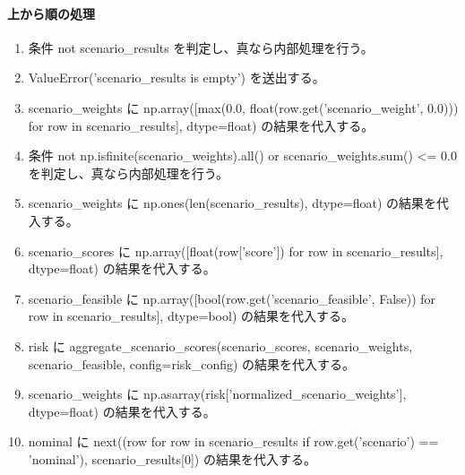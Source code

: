 \documentclass[a4paper,11pt]{article}
\begin{document}
            \paragraph{上から順の処理}
            \begin{enumerate}[leftmargin=1.8em]
            \item 条件 not scenario\_results を判定し、真なら内部処理を行う。
\item   ValueError('scenario\_results is empty') を送出する。
\item scenario\_weights に np.array([max(0.0, float(row.get('scenario\_weight', 0.0))) for row in scenario\_results], dtype=float) の結果を代入する。
\item 条件 not np.isfinite(scenario\_weights).all() or scenario\_weights.sum() <= 0.0 を判定し、真なら内部処理を行う。
\item   scenario\_weights に np.ones(len(scenario\_results), dtype=float) の結果を代入する。
\item scenario\_scores に np.array([float(row['score']) for row in scenario\_results], dtype=float) の結果を代入する。
\item scenario\_feasible に np.array([bool(row.get('scenario\_feasible', False)) for row in scenario\_results], dtype=bool) の結果を代入する。
\item risk に aggregate\_scenario\_scores(scenario\_scores, scenario\_weights, scenario\_feasible, config=risk\_config) の結果を代入する。
\item scenario\_weights に np.asarray(risk['normalized\_scenario\_weights'], dtype=float) の結果を代入する。
\item nominal に next((row for row in scenario\_results if row.get('scenario') == 'nominal'), scenario\_results[0]) の結果を代入する。

\end{enumerate}
\end{document}
